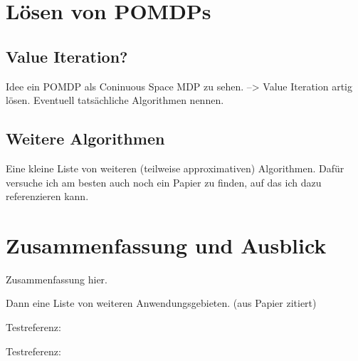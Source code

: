 \documentclass[a4paper]{IEEEtran}
\begin{document}
\section{Lösen von POMDPs}
\subsection{Value Iteration?}
Idee ein POMDP als Coninuous Space MDP zu sehen. --> Value Iteration artig lösen. Eventuell tatsächliche Algorithmen nennen.

\subsection{Weitere Algorithmen}
Eine kleine Liste von weiteren (teilweise approximativen) Algorithmen. Dafür versuche ich am besten auch noch ein Papier zu finden, auf das ich dazu referenzieren kann.

\section{Zusammenfassung und Ausblick}
Zusammenfassung hier.

Dann eine Liste von weiteren Anwendungsgebieten. (aus Papier zitiert)

Testreferenz: \cite{russell1995artificial}

Testreferenz: \cite{cassandra1998survey}



\end{document}
